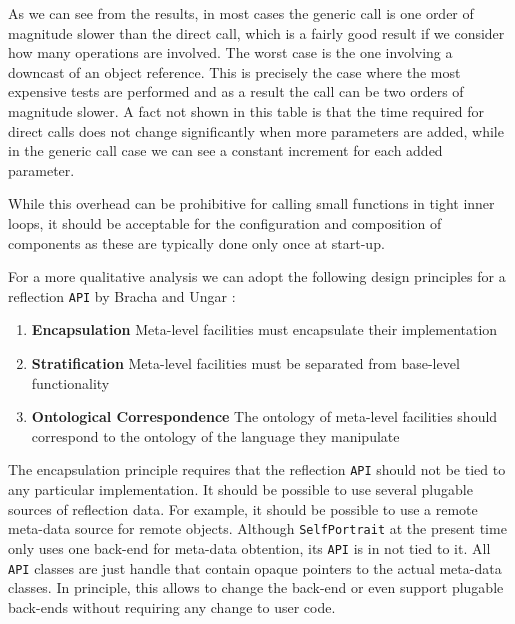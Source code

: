 As we can see from the results, in most cases the generic call is one order of magnitude slower than the direct call, which is a fairly good result
if we consider how many operations are involved. The worst case is the one involving a downcast of an object reference. This is precisely the case
where the most expensive tests are performed and as a result the call can be two orders of magnitude slower. A fact not shown in this table is that
the time required for direct calls does not change significantly when more parameters are added, while in the generic call case we can see a
constant increment for each added parameter.

While this overhead can be prohibitive for calling small functions in tight inner loops, it should be acceptable for the configuration and composition
of components as these are typically done only once at start-up.


For a more qualitative analysis we can adopt the following design principles for a reflection \texttt{API} by Bracha and Ungar \cite{Bracha}:

\begin{enumerate}
 \item \textbf{Encapsulation} Meta-level facilities must encapsulate their implementation
 \item \textbf{Stratification} Meta-level facilities must be separated from base-level functionality
 \item \textbf{Ontological Correspondence} The ontology of meta-level facilities should correspond to the ontology of the language they manipulate
\end{enumerate}

The encapsulation principle requires that the reflection \texttt{API} should not be tied to any particular implementation. It should be possible
to use several plugable sources of reflection data. For example, it should be possible to use a remote meta-data source for remote objects.
Although \texttt{SelfPortrait} at the present time only uses one back-end for meta-data obtention, its \texttt{API} is in not tied to it. All \texttt{API}
classes are just handle that contain opaque pointers to the actual meta-data classes. In principle, this allows to change the back-end or even
support plugable back-ends without requiring any change to user code.

